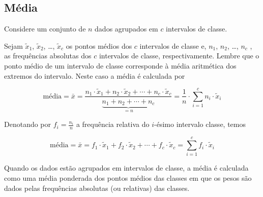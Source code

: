 






\clearpage

\label{\detokenize{PE104-A:sec-para-saber-mais}}\label{\detokenize{PE104-A::doc}}\label{\detokenize{PE104-A:para-saber-mais}}


\subsection{Média}

Considere um conjunto de \(n\) dados agrupados em \(c\) intervalos de classe.

Sejam \(\tilde{x}_{1}\), \(\tilde{x}_{2}\), \dots, \(\tilde{x}_{c}\) os pontos médios dos \(c\) intervalos de classe e, \(n_1\), \(n_2\), \dots, \(n_c\) ,  as frequências absolutas dos \(c\) intervalos de classe, respectivamente. Lembre que o ponto médio de um intervalo de classe  corresponde à média aritmética dos extremos do intervalo. Neste caso a média é calculada por

$$\text{média}=\bar{x}=\frac{n_1\cdot \tilde{x}_{1}+n_2\cdot \tilde{x}_{2}+\cdots+n_c\cdot \tilde{x}_{c}}{\underbrace{n_1+n_2+\cdots+n_c}_{=n}}=\frac{1}{n}\cdot \displaystyle{\sum^c_{i=1}}n_i\cdot \tilde{x}_i$$

Denotando por \(f_i=\frac{n_i}{n}\) a frequência relativa do \(i\)-ésimo intervalo classe, temos

$$\text{média}=\bar{x}=f_1\cdot \tilde{x}_{1}+f_2\cdot \tilde{x}_{2}+\cdots +f_c\cdot \tilde{x}_{c}=\displaystyle{\sum^c_{i=1}}f_i\cdot \tilde{x}_i$$

Quando os dados estão agrupados em intervalos de classe, a média é calculada como uma média ponderada dos pontos médios das classes em que os pesos são dados pelas frequências absolutas (ou relativas) das classes.

